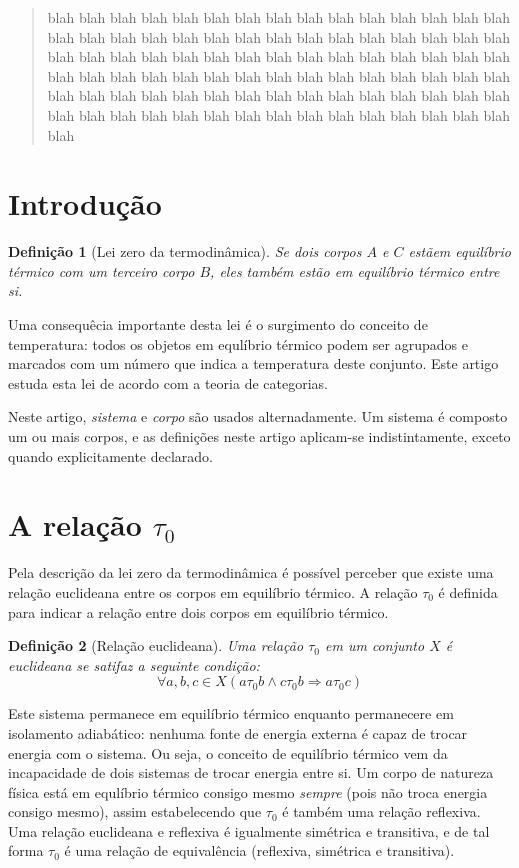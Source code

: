 \documentclass[a4paper]{article}
\newcommand{\trls}{{\tau_0}}
\newcommand{\trl}[2]{{#1 \trls #2}}
\newtheorem{definicao}{Definição}[section]
\begin{document}
\begin{abstract}
blah blah blah blah blah blah blah blah blah blah blah blah blah blah blah blah blah blah blah blah blah blah blah blah blah blah blah blah blah blah blah blah blah blah blah blah blah blah blah blah blah blah blah blah blah blah blah blah blah blah blah blah blah blah blah blah blah blah blah blah blah blah blah blah blah blah blah blah blah blah blah blah blah blah blah blah blah blah blah blah blah blah blah blah blah blah blah blah blah blah blah
\end{abstract}

\section*{Introdução}
\begin{definicao}[Lei zero da termodinâmica] \label{def:0th}
Se dois corpos $A$ e $C$ estãem equilíbrio térmico com um terceiro corpo $B$, eles também estão em equilíbrio térmico entre si.
\end{definicao}
Uma consequêcia importante desta lei é o surgimento do conceito de temperatura: todos os objetos em equlíbrio térmico podem ser agrupados e marcados com um número que indica a temperatura deste conjunto. Este artigo estuda esta lei de acordo com a teoria de categorias.

Neste artigo, {\it sistema} e {\it corpo} são usados alternadamente. Um sistema é composto um ou mais corpos, e as definições neste artigo aplicam-se indistintamente, exceto quando explicitamente declarado.

\section*{A relação $\trls$}
Pela descrição da lei zero da termodinâmica é possível perceber que existe uma relação euclideana entre os corpos em equilíbrio térmico. A relação $\trls$ é definida para indicar a relação entre dois corpos em equilíbrio térmico.

\begin{definicao}[Relação euclideana]  \label{def:euclidean}
Uma relação $\trls$ em um conjunto $X$ é euclideana se satifaz a seguinte condição:
\begin{equation}
\forall a, b, c \in X (\trl{a}{b} \wedge \trl{c}{b} \Rightarrow \trl{a}{c})
\end{equation}
\end{definicao}

Este sistema permanece em equilíbrio térmico enquanto permanecere em isolamento adiabático: nenhuma fonte de energia externa é capaz de trocar energia com o sistema. Ou seja, o conceito de equilíbrio térmico vem da incapacidade de dois sistemas de trocar energia entre si. Um corpo de natureza física está em equlíbrio térmico consigo mesmo {\it sempre} (pois não troca energia consigo mesmo), assim estabelecendo que $\trls$ é também uma relação reflexiva. Uma relação euclideana e reflexiva é igualmente simétrica e transitiva, e de tal forma $\trls$ é uma relação de equivalência (reflexiva, simétrica e transitiva).
\end{document}
